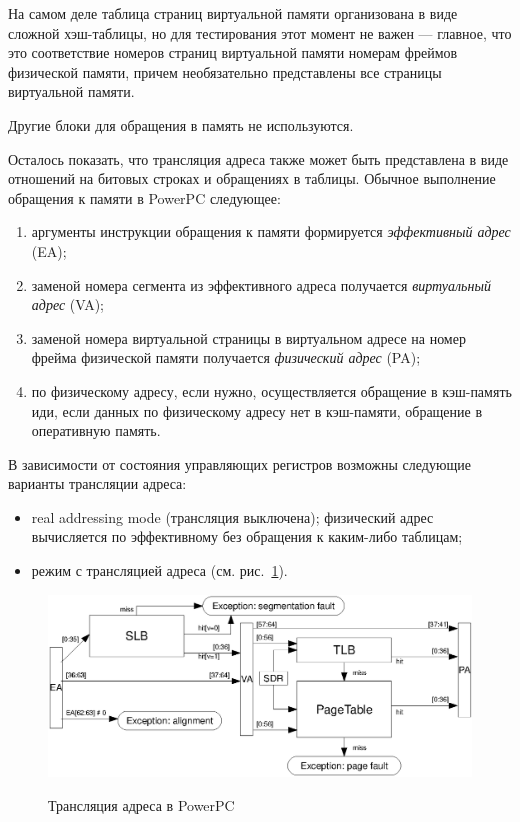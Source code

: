 \documentclass[14pt]{extreport}
\begin{document}
На самом деле таблица страниц виртуальной памяти организована в виде сложной хэш-таблицы, но для тестирования этот момент не важен --- главное, что это соответствие номеров страниц виртуальной памяти номерам фреймов физической памяти, причем необязательно представлены все страницы виртуальной памяти.

Другие блоки для обращения в память не используются.

Осталось показать, что трансляция адреса также может быть представлена в виде
отношений на битовых строках и обращениях в таблицы. Обычное выполнение обращения к памяти в PowerPC следующее:
\begin{enumerate}
    \item аргументы инструкции обращения к памяти формируется \emph{эффективный адрес} (EA);
    \item заменой номера сегмента из эффективного адреса получается \emph{виртуальный адрес} (VA);
    \item заменой номера виртуальной страницы в виртуальном адресе на номер фрейма физической памяти получается \emph{физический адрес} (PA);
    \item по физическому адресу, если нужно, осуществляется обращение в кэш-память иди, если данных по физическому адресу нет в кэш-памяти, обращение в оперативную память.
\end{enumerate}

В зависимости от состояния управляющих регистров возможны следующие варианты трансляции адреса:
\begin{itemize}
  \item real addressing mode (трансляция выключена); физический адрес вычисляется по эффективному без обращения к каким-либо таблицам;
  \item режим с трансляцией адреса (см. рис.~\ref{fig:ppc_address_translation}).
\end{itemize}

\begin{figure}[h] \center
  \includegraphics[width=\textwidth]{4.analysis/ppc_addrtrans}\\
  \caption{Трансляция адреса в PowerPC}\label{fig:ppc_address_translation}
\end{figure}
\end{document}
